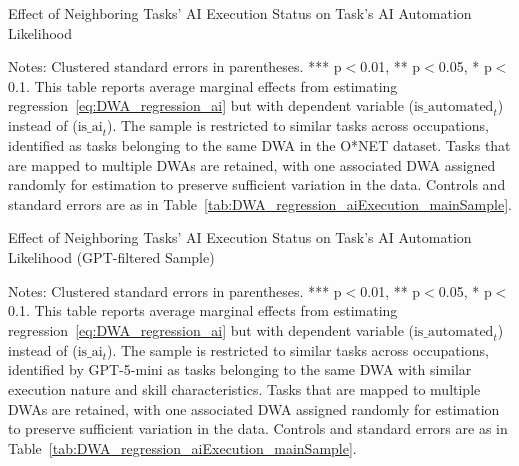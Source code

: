 \begin{table}[!t]
\centering
\caption{Effect of Neighboring Tasks' AI Execution Status on Task's AI Automation Likelihood}
\label{tab:DWA_regression_aiAutomation_mainSample}
    \footnotesize
\resizebox{\textwidth}{!}{

}
\begin{minipage}{1\linewidth}
\begin{spacing}{0.2}
{\fontsize{9.5pt}{10pt}\selectfont Notes: Clustered standard errors in parentheses. *** p$<$0.01, ** p$<$0.05, * p$<$0.1.
This table reports average marginal effects from estimating regression~\eqref{eq:DWA_regression_ai} but with dependent variable ($\text{is\_automated}_{t}$) instead of ($\text{is\_ai}_{t}$).
The sample is restricted to similar tasks across occupations, identified as tasks belonging to the same DWA in the O*NET dataset.
Tasks that are mapped to multiple DWAs are retained, with one associated DWA assigned randomly for estimation to preserve sufficient variation in the data.
Controls and standard errors are as in Table~\ref{tab:DWA_regression_aiExecution_mainSample}.}
\end{spacing}
\end{minipage}\end{table}

\begin{table}[!t]
\centering
\caption{Effect of Neighboring Tasks' AI Execution Status on Task's AI Automation Likelihood (GPT-filtered Sample)}
\label{tab:DWA_regression_aiAutomation_GPTsample}
    \footnotesize
\resizebox{\textwidth}{!}{

}
\begin{minipage}{1\linewidth}
\begin{spacing}{0.2}
{\fontsize{9.5pt}{10pt}\selectfont Notes: Clustered standard errors in parentheses. *** p$<$0.01, ** p$<$0.05, * p$<$0.1.
This table reports average marginal effects from estimating regression~\eqref{eq:DWA_regression_ai} but with dependent variable ($\text{is\_automated}_{t}$) instead of ($\text{is\_ai}_{t}$).
The sample is restricted to similar tasks across occupations, identified by GPT-5-mini as tasks belonging to the same DWA with similar execution nature and skill characteristics.
Tasks that are mapped to multiple DWAs are retained, with one associated DWA assigned randomly for estimation to preserve sufficient variation in the data.
Controls and standard errors are as in Table~\ref{tab:DWA_regression_aiExecution_mainSample}.}
\end{spacing}
\end{minipage}\end{table}

